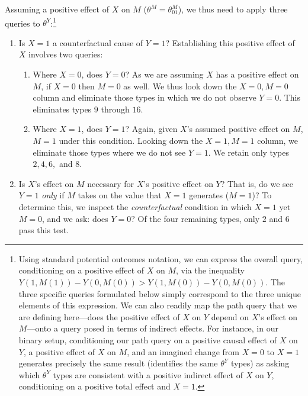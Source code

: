 \documentclass[12pt,]{book}
\let\rmarkdownfootnote\footnote%
\def\footnote{\protect\rmarkdownfootnote}
\begin{document}
Assuming a positive effect of \(X\) on \(M\) (\(\theta^M=\theta^M_{01}\)), we thus need to apply three queries to \(\theta^Y\):\footnote{Using standard potential outcomes notation, we can express the overall query, conditioning on a positive effect of \(X\) on \(M\), via the inequality \(Y(1, M(1)) - Y(0, M(0)) > Y(1, M(0)) - Y(0, M(0))\). The three specific queries formulated below simply correspond to the three unique elements of this expression. We can also readily map the path query that we are defining here---does the positive effect of \(X\) on \(Y\) depend on \(X\)'s effect on \(M\)---onto a query posed in terms of indirect effects. For instance, in our binary setup, conditioning our path query on a positive causal effect of \(X\) on \(Y\), a positive effect of \(X\) on \(M\), and an imagined change from \(X=0\) to \(X=1\) generates precisely the same result (identifies the same \(\theta^Y\) types) as asking which \(\theta^Y\) types are consistent with a positive indirect effect of \(X\) on \(Y\), conditioning on a positive total effect and \(X=1\).}

\begin{enumerate}
\def\labelenumi{\arabic{enumi}.}
\item
  Is \(X=1\) a counterfactual cause of \(Y=1\)? Establishing this positive effect of \(X\) involves two queries:

  \begin{enumerate}
  \def\labelenumii{\alph{enumii})}
  \item
    Where \(X=0\), does \(Y=0\)? As we are assuming \(X\) has a positive effect on \(M\), if \(X=0\) then \(M=0\) as well. We thus look down the \(X=0, M=0\) column and eliminate those types in which we do not observe \(Y=0\). This eliminates types \(9\) through \(16\).
  \item
    Where \(X=1\), does \(Y=1\)? Again, given \(X\)'s assumed positive effect on \(M\), \(M=1\) under this condition. Looking down the \(X=1, M=1\) column, we eliminate those types where we do not see \(Y=1\). We retain only types \(2, 4, 6,\) and \(8\).
  \end{enumerate}
\item
  Is \(X\)'s effect on \(M\) necessary for \(X\)'s positive effect on \(Y\)? That is, do we see \(Y=1\) \emph{only} if \(M\) takes on the value that \(X=1\) generates (\(M=1\))? To determine this, we inspect the \emph{counterfactual} condition in which \(X=1\) yet \(M=0\), and we ask: does \(Y=0\)? Of the four remaining types, only \(2\) and \(6\) pass this test.
\end{enumerate}
\end{document}
